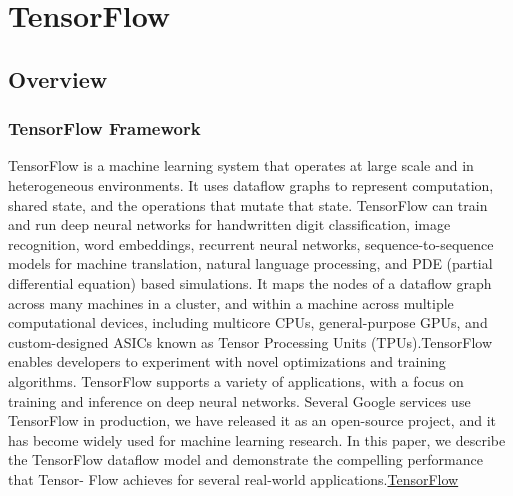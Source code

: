 %
%
%



    
\chapter{TensorFlow} \label{Kapitel_TF}

\section{Overview}

\subsection{TensorFlow Framework} 

TensorFlow is a machine learning system that operates at large scale and in heterogeneous environments. It uses dataflow graphs to represent computation, shared state, and the operations that mutate that state. TensorFlow can train and run deep neural networks for handwritten digit classification, image recognition, word embeddings, recurrent neural networks, sequence-to-sequence models for machine translation, natural language processing, and PDE (partial differential equation) based simulations. It maps the nodes of a dataflow graph across many machines in a cluster, and within a machine across multiple computational devices, including multicore CPUs, general-purpose GPUs, and custom-designed ASICs known as Tensor Processing Units (TPUs).TensorFlow enables developers to experiment with novel optimizations and training algorithms. TensorFlow supports a variety of applications, with a focus on training and inference on deep neural networks. Several Google services use TensorFlow in production, we have released it as an open-source project, and it has become widely used for machine learning research. In this paper, we describe the TensorFlow dataflow model and demonstrate the compelling performance that Tensor- Flow achieves for several real-world applications.\href{https://www.tensorflow.org/overview/}{TensorFlow}

